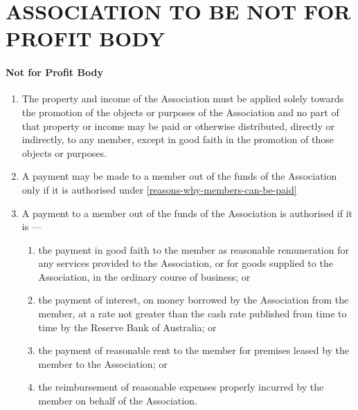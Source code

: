 \documentclass[../constitution.tex]{subfiles}
\begin{document}
\part{ASSOCIATION TO BE NOT FOR PROFIT BODY} \label{part-2-association-to-be-not-for-profit-body}


\subsection{Not for Profit Body} \label{not-for-profit-body} 

\begin{enumerate}

\item The property and income of the Association must be applied solely towards the promotion of the objects or purposes of the Association and no part of that property or income may be paid or otherwise distributed, directly or indirectly, to any member, except in good faith in the promotion of those objects or purposes.
\item A payment may be made to a member out of the funds of the Association only if it is authorised under  \ref{reasons-why-members-can-be-paid}
\item A payment to a member out of the funds of the Association is authorised if it is ---

  \begin{enumerate} \label{reasons-why-members-can-be-paid}
  \item the payment in good faith to the member as reasonable remuneration for any services provided to the Association, or for goods supplied to the Association, in the ordinary course of business; or
  \item the payment of interest, on money borrowed by the Association from the member, at a rate not greater than the cash rate published from time to time by the Reserve Bank of Australia; or
  \item the payment of reasonable rent to the member for premises leased by the member to the Association; or
  \item the reimbursement of reasonable expenses properly incurred by the member on behalf of the Association.
  \end{enumerate}
\end{enumerate}

\end{document}
